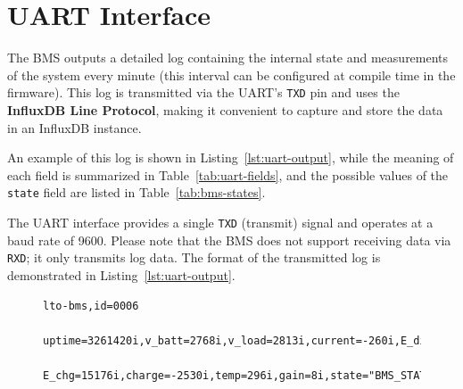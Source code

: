 \documentclass[11pt]{datasheet}
\begin{document}
\section{UART Interface}

The BMS outputs a detailed log containing the internal state and measurements of
the system every minute (this interval can be configured at compile time in the
firmware). This log is transmitted via the UART's \texttt{TXD} pin and uses the
\textbf{InfluxDB Line Protocol}, making it convenient to capture and store the
 data in an InfluxDB instance.

An example of this log is shown in Listing~\ref{lst:uart-output}, while the meaning
of each field is summarized in Table~\ref{tab:uart-fields}, and the possible
values of the \texttt{state} field are listed in Table~\ref{tab:bms-states}.

The UART interface provides a single \texttt{TXD} (transmit) signal and operates
at a baud rate of 9600. Please note that the BMS does not support receiving
data via \texttt{RXD}; it only transmits log data. The format of the
transmitted log is demonstrated in Listing~\ref{lst:uart-output}.

\begin{figure}[!h]
    \centering
    \begin{lstlisting}[caption={UART Output Example}, label={lst:uart-output}, linewidth=0.81\textwidth]
    lto-bms,id=0006
      uptime=3261420i,v_batt=2768i,v_load=2813i,current=-260i,E_dis=8163i,
      E_chg=15176i,charge=-2530i,temp=296i,gain=8i,state="BMS_STATE_CHARGING"
    \end{lstlisting}
\end{figure}
\end{document}
